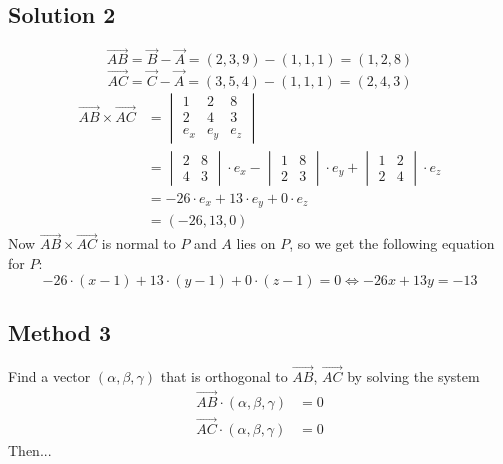 \documentclass[a4paper,10pt]{article}
\begin{document}
\subsection{Solution 2}
\[
    \overrightarrow{AB} = \overrightarrow{B} - \overrightarrow{A} = (2, 3, 9) - (1, 1, 1) = (1, 2, 8)
\]
\[
    \overrightarrow{AC} = \overrightarrow{C} - \overrightarrow{A} = (3, 5, 4) - (1, 1, 1) = (2, 4, 3)
\]
\begin{align*}
    \overrightarrow{AB} \times \overrightarrow{AC} & = \begin{vmatrix}
                                                           1 & 2 & 8 \\ 2 & 4 & 3 \\ e_x & e_y & e_z
                                                       \end{vmatrix} \\ & =  \begin{vmatrix}
        2 & 8 \\ 4 & 3
    \end{vmatrix} \cdot e_x - \begin{vmatrix}
        1 & 8 \\ 2 & 3
    \end{vmatrix} \cdot e_y + \begin{vmatrix}
        1 & 2 \\ 2 & 4
    \end{vmatrix} \cdot e_z \\
                                                   & = -26 \cdot e_x + 13\cdot e_y + 0\cdot e_z \\
                                                   & = (-26, 13, 0)
\end{align*}
Now $\overrightarrow{AB} \times \overrightarrow{AC}$ is normal to $P$ and $A$ lies on $P$, so we get the following equation for $P$:
\[
    -26\cdot(x -1) + 13\cdot (y-1) + 0\cdot (z-1) = 0 \iff -26x + 13y = -13
\]

\subsection{Method 3}
Find a vector $(\alpha, \beta, \gamma)$ that is orthogonal to $\overrightarrow{AB}$, $\overrightarrow{AC}$ by solving the system
\begin{align*}
    \overrightarrow{AB}\cdot (\alpha, \beta, \gamma) & = 0 \\
    \overrightarrow{AC}\cdot (\alpha, \beta, \gamma) & = 0
\end{align*}
Then...
\end{document}
